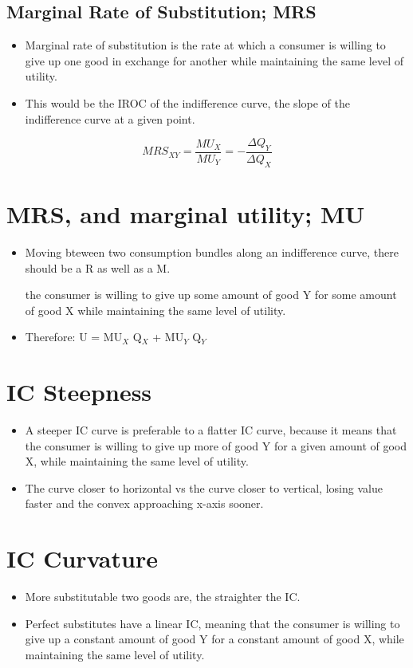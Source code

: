 \documentclass{article}
\begin{document}
\subsection{Marginal Rate of Substitution; MRS}
\begin{itemize}
  \item Marginal rate of substitution is the rate at which a consumer is willing to give up one good
    in exchange for another while maintaining the same level of utility.
  \item This would be the IROC of the indifference curve,
    the slope of the indifference curve at a given point.
\end{itemize}
$$ MRS_{XY} = \frac{MU_X}{MU_Y} = -\frac{\Delta Q_Y}{\Delta Q_X} $$

\section*{MRS, and marginal utility; MU}
\begin{itemize}
  \item Moving bteween two consumption bundles along an indifference curve,
    there should be a \Delta R as well as a \Delta M.

    the consumer is willing to give up some amount of good Y for some amount of good X
    while maintaining the same level of utility.
  \item Therefore: \Delta U = MU$_X$ \Delta Q$_X$ + MU$_Y$ \Delta Q$_Y$
\end{itemize}

\section*{IC Steepness}
\begin{itemize}
  \item A steeper IC curve is preferable to a flatter IC curve,
    because it means that the consumer is willing to give up more of good Y
    for a given amount of good X, while maintaining the same level of utility.
  \item The curve closer to horizontal vs the curve closer to vertical,
    losing value faster and the convex approaching x-axis sooner.
\end{itemize}

\section*{IC Curvature}
\begin{itemize}
  \item More substitutable two goods are, the straighter the IC.
  \item Perfect substitutes have a linear IC,
    meaning that the consumer is willing to give up a constant amount of good Y
    for a constant amount of good X, while maintaining the same level of utility.
\end{itemize}
\end{document}
